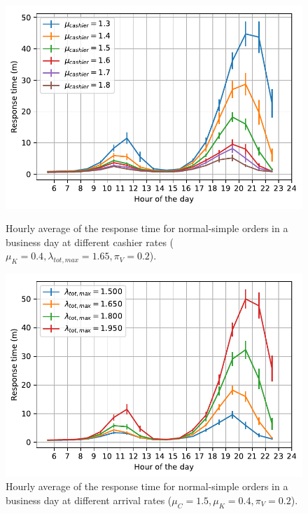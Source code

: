 \begin{figure}
  \begin{minipage}{0.48\textwidth}
    \centering
    \includegraphics[width=\textwidth]{figs/business_day/varying_cashier_rate.pdf}
    \caption{Hourly average of the response time for normal-simple orders in a business day at different cashier rates ($\mu_K=0.4, \lambda_{tot,max} = 1.65, \pi_V=0.2$).}
    \label{fig:bd:var_cr}
  \end{minipage}\hspace{0.03\textwidth}
  \begin{minipage}{0.48\textwidth}
    \centering
    \includegraphics[width=\textwidth]{figs/business_day/varying_arrival_rate.pdf}
    \caption{Hourly average of the response time for normal-simple orders in a business day at different arrival rates ($\mu_C = 1.5, \mu_K=0.4, \pi_V=0.2$).}
    \label{fig:bd:var_ar}
  \end{minipage}
\end{figure}

